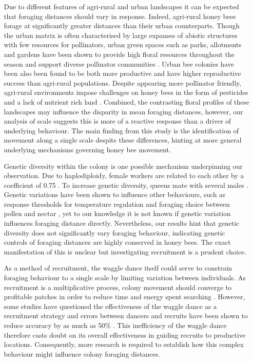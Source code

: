 \documentclass[11pt,usenames,dvipsnames,a4paper]{article}
\begin{document}
\begin{linenumbers}
Due to different features of agri-rural and urban landscapes it can be expected that foraging distances should vary in response. Indeed, agri-rural honey bees forage at significantly greater distances than their urban counterparts. Though the urban matrix is often characterised by large expanses of abiotic structures with few resources for pollinators, urban green spaces such as parks, allotments and gardens have been shown to provide high floral resources throughout the season \citep{Baldock2015, Plascencia2017, Baldock2019} and support diverse pollinator communities \citep{Hall2017}. Urban bee colonies have been also been found to be both more productive \citep{Lecocq2015} and have higher reproductive success \citep{Samuelson2018} than agri-rural populations. Despite appearing more pollinator friendly, agri-rural environments impose challenges on honey bees in the form of pesticides \citep{Wood2017} and a lack of nutrient rich land \citep{Carvell2006}. Combined, the contrasting floral profiles of these landscapes may influence the disparity in mean foraging distances, however, our analysis of scale suggests this is more of a reactive response than a driver of underlying behaviour. The main finding from this study is the identification of movement along a single scale despite these differences, hinting at more general underlying mechanisms governing honey bee movement.

Genetic diversity within the colony is one possible mechanism underpinning our observation. Due to haplodiploidy, female workers are related to each other by a coefficient of 0.75 \citep{Ratnieks1989}. To increase genetic diversity, queens mate with several males \citep{Jones2004}. Genetic variations have been shown to influence other behaviours, such as response thresholds for temperature regulation \citep{Jones2004} and foraging choice between pollen and nectar \citep{Fewell1993, Fewell2000}, yet to our knowledge it is not known if genetic variation influences foraging distance directly. Nevertheless, our results hint that genetic diversity does not significantly vary foraging behaviour, indicating genetic controls of foraging distances are highly conserved in honey bees. The exact manifestation of this is unclear but investigating recruitment is a prudent choice.

As a method of recruitment, the waggle dance itself could serve to constrain foraging behaviour to a single scale by limiting variation between individuals. As recruitment is a multiplicative process, colony movement should converge to profitable patches in order to reduce time and energy spent searching \citep{Seeley1995}. However, some studies have questioned the effectiveness of the waggle dance as a recruitment strategy \citep{Sherman2002, Dornhaus2004, Gruter2008, Gruter2009, Schurch2013} and errors between dancers and recruits have been shown to reduce accuracy by as much as 50\% \citep{Schurch2013}. This inefficiency of the waggle dance therefore casts doubt on its overall effectiveness in guiding recruits to productive locations. Consequently, more research is required to establish how this complex behaviour might influence colony foraging distances.


\end{linenumbers}
\end{document}
